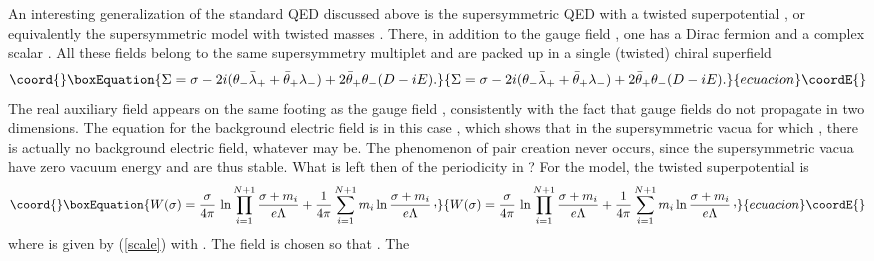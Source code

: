 \documentclass[a4paper,12pt]{article}
\def\cvp{\raise 2pt\hbox{,}}
\def\im{\mathop{\rm Im}\nolimits}
\def\cpN{{\mathbb C}P^{N}}
\begin{document}
An interesting generalization of the standard QED\coordHE{} discussed above
is the \coordHE{} supersymmetric QED\coordHE{} with a twisted 
superpotential \coordHE{}, or 
equivalently the \coordHE{} supersymmetric \myHighlight{$\cpN$}\coordHE{} model with 
twisted masses \coordHE{} \cite{AG,HH,Dorey}. There, in 
addition to the gauge field \coordHE{},
one has a Dirac fermion \myHighlight{$\lambda$}\coordHE{} and a 
complex scalar \myHighlight{$\sigma$}\coordHE{}. All these 
fields belong to the same supersymmetry multiplet and are packed up in a 
single (twisted) chiral superfield
%
\begin{equation}\coord{}\boxEquation{
\label{ssuper}
\Sigma = \sigma -2i(\theta_{-}\bar\lambda_{+} + 
\bar\theta_{+}\lambda_{-}) + 2\bar\theta_{+}\theta_{-}(D-iE).
}{
\Sigma = \sigma -2i(\theta_{-}\bar\lambda_{+} + 
\bar\theta_{+}\lambda_{-}) + 2\bar\theta_{+}\theta_{-}(D-iE).
}{ecuacion}\coordE{}\end{equation}
%
The real auxiliary field \coordHE{} appears on the same footing as the gauge 
field \coordHE{}, consistently with the fact that gauge fields do not propagate in 
two dimensions. The equation 
for the background electric field is in this case
\myHighlight{$E=-2e^{2}\im W'(\sigma)$}\coordHE{}, which shows that in the supersymmetric vacua for 
which \coordHE{}, there is actually no background electric field, 
whatever \myHighlight{$\theta$}\coordHE{} may be. The phenomenon of pair creation never occurs, 
since the supersymmetric vacua have zero vacuum energy and are thus stable.
What is left then of the \myHighlight{$2\pi$}\coordHE{} periodicity in \myHighlight{$\theta$}\coordHE{}? For the \myHighlight{$\cpN$}\coordHE{} 
model, the twisted superpotential is \cite{adda2,HH,Dorey}
%
\begin{equation}\coord{}\boxEquation{
\label{weff2}
W(\sigma) = {\sigma\over 4\pi}\,\ln\prod_{i=1}^{N+1}{\sigma + 
m_{i}\over e\Lambda} + {1\over 4\pi}\sum_{i=1}^{N+1} m_{i}\ln 
{\sigma + m_{i}\over e\Lambda}\,\cvp
}{
W(\sigma) = {\sigma\over 4\pi}\,\ln\prod_{i=1}^{N+1}{\sigma + 
m_{i}\over e\Lambda} + {1\over 4\pi}\sum_{i=1}^{N+1} m_{i}\ln 
{\sigma + m_{i}\over e\Lambda}\,\cvp
}{ecuacion}\coordE{}\end{equation}
%
where \myHighlight{$\Lambda$}\coordHE{} is given by (\ref{scale}) with \coordHE{}.
The field \myHighlight{$\sigma$}\coordHE{} is chosen so that \coordHE{}. The 
\end{document}
